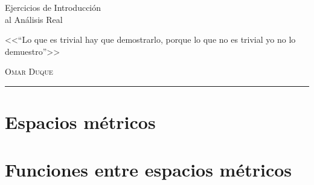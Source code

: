 \documentclass[12pt,a4paper]{report}
\begin{document}
\begin{titlepage}
\vspace*{2cm}

\noindent
\vspace*{0.5cm}
\titlefont Ejercicios de Introducción\\ al Análisis Real \par
\vspace{1.5cm}
\epigraph{<<``Lo que es trivial hay que demostrarlo, porque lo que no es trivial yo no lo demuestro''>>}%
{ \textsc{Omar Duque}}
\null\vfill
\vspace*{1cm}
\noindent
\hfill
\begin{minipage}{0.7\linewidth}
    \begin{flushright}
        \printauthor
    \end{flushright}
\end{minipage}
%
\begin{minipage}{0.02\linewidth}
    \rule{1pt}{140pt}
\end{minipage}
\titlepagedecoration
\end{titlepage}


\tableofcontents
\cleardoublepage


\chapter{Espacios métricos}

\chapter{Funciones entre espacios métricos}

\end{document}
